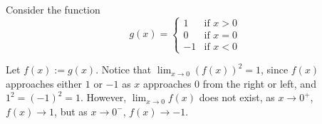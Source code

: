 Consider the function
\[
g(x) = \begin{cases}
 1 & \text{if } x > 0 \\
 0 & \text{if } x = 0 \\
 -1 & \text{if } x < 0
\end{cases}
\]

Let $f(x) := g(x)$. Notice that $\lim_{x \to 0} (f(x))^2 = 1$, since $f(x)$ approaches either $1$ or $-1$ as $x$ approaches $0$ from the right or left, and $1^2 = (-1)^2 = 1$. However, $\lim_{x \to 0} f(x)$ does not exist, as $x \to 0^+$, $f(x) \to 1$, but as $x \to 0^-$, $f(x) \to -1$.

\qq


